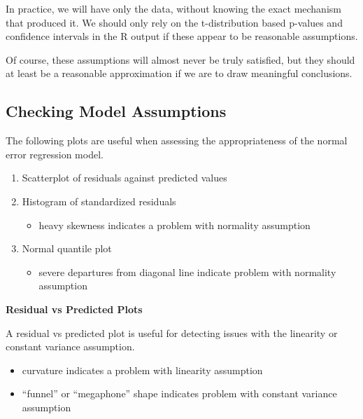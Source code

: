 \documentclass[
  letterpaper,
  DIV=11,
  numbers=noendperiod]{scrreprt}
\providecommand{\tightlist}{%
  \setlength{\itemsep}{0pt}\setlength{\parskip}{0pt}}\usepackage{longtable,booktabs,array}
\begin{document}
In practice, we will have only the data, without knowing the exact
mechanism that produced it. We should only rely on the t-distribution
based p-values and confidence intervals in the R output if these appear
to be reasonable assumptions.

Of course, these assumptions will almost never be truly satisfied, but
they should at least be a reasonable approximation if we are to draw
meaningful conclusions.

\subsection{Checking Model
Assumptions}\label{checking-model-assumptions}

The following plots are useful when assessing the appropriateness of the
normal error regression model.

\begin{enumerate}
\def\labelenumi{\arabic{enumi}.}
\item
  Scatterplot of residuals against predicted values
\item
  Histogram of standardized residuals

  \begin{itemize}
  \tightlist
  \item
    heavy skewness indicates a problem with normality assumption
  \end{itemize}
\item
  Normal quantile plot

  \begin{itemize}
  \tightlist
  \item
    severe departures from diagonal line indicate problem with normality
    assumption
  \end{itemize}
\end{enumerate}

\textbf{Residual vs Predicted Plots}

A residual vs predicted plot is useful for detecting issues with the
linearity or constant variance assumption.

\begin{itemize}
\tightlist
\item
  curvature indicates a problem with linearity assumption\\
\item
  ``funnel'' or ``megaphone'' shape indicates problem with constant
  variance assumption
\end{itemize}
\end{document}
